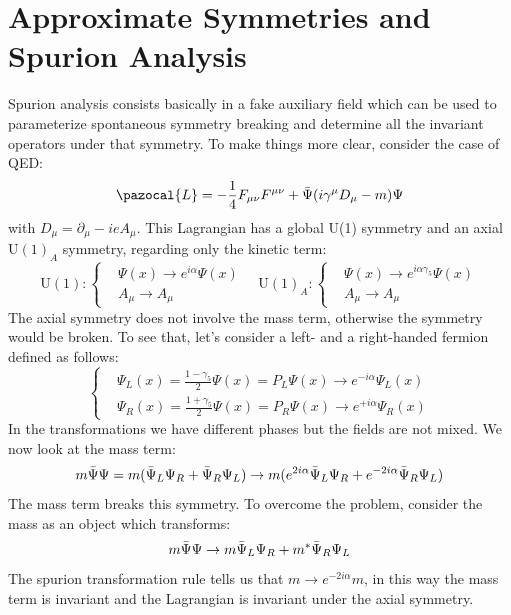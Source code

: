 \documentclass[../main.tex]{subfiles}
\begin{document}
\section{Approximate Symmetries and Spurion Analysis}
Spurion analysis consists basically in a fake auxiliary field which can be used to parameterize spontaneous symmetry breaking and determine all the invariant operators under that symmetry. To make things more clear, consider the case of QED:
\[
\pazocal{L}=-\frac{1}{4}F_{\mu\nu}F^{\mu\nu}+\Bar{\Psi}(i\gamma^\mu D_\mu-m)\Psi
\]
with $D_\mu=\partial_\mu-ieA_\mu$. This Lagrangian has a global U(1) symmetry and an axial U$(1)_A$ symmetry, regarding only the kinetic term:
\[
\text{U}(1):
\left\{
\begin{aligned}
&\Psi(x)\to e^{i\alpha}\Psi(x)\\
&A_\mu\to A_\mu
\end{aligned}
\right.
\quad 
\text{U}(1)_A:
\left\{
\begin{aligned}
&\Psi(x)\to e^{i\alpha\gamma_5}\Psi(x)\\
&A_\mu\to A_\mu
\end{aligned}
\right.
\]
The axial symmetry does not involve the mass term, otherwise the symmetry would be broken. To see that, let's consider a left- and a right-handed fermion defined as follows:
\[
\left\{
\begin{aligned}
&\Psi_L(x)=\frac{1-\gamma_5}{2}\Psi(x)=P_L\Psi(x)\to e^{-i\alpha}\Psi_L(x)\\
&\Psi_R(x)=\frac{1+\gamma_5}{2}\Psi(x)=P_R\Psi(x)\to e^{+i\alpha}\Psi_R(x)
\end{aligned}
\right.
\]
In the transformations we have different phases but the fields are not mixed. We now look at the mass term:
\[
m\Bar{\Psi}\Psi=m(\Bar{\Psi}_L\Psi_R+\Bar{\Psi}_R\Psi_L)\to m(e^{2i\alpha}\Bar{\Psi}_L\Psi_R+e^{-2i\alpha}\Bar{\Psi}_R\Psi_L)
\]
The mass term breaks this symmetry. To overcome the problem, consider the mass as an object which transforms:
\[
m\Bar{\Psi}\Psi\to m\Bar{\Psi}_L\Psi_R+m^*\Bar{\Psi}_R\Psi_L
\]
The spurion transformation rule tells us that $m\to e^{-2i\alpha}m$, in this way the mass term is invariant and the Lagrangian is invariant under the axial symmetry.\\
\end{document}
